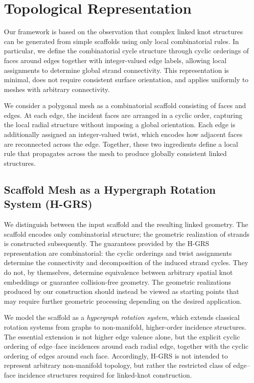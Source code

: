 \documentclass[acmtog]{acmart}
\begin{document}
\section{Topological Representation}
\label{sec:representation}

Our framework is based on the observation that complex linked knot structures can be generated from simple scaffolds using only local combinatorial rules. In particular, we define the combinatorial cycle structure through cyclic orderings of faces around edges together with integer-valued edge labels, allowing local assignments to determine global strand connectivity. This representation is minimal, does not require consistent surface orientation, and applies uniformly to meshes with arbitrary connectivity.

We consider a polygonal mesh as a combinatorial scaffold consisting of faces and edges. At each edge, the incident faces are arranged in a cyclic order, capturing the local radial structure without imposing a global orientation. Each edge is additionally assigned an integer-valued twist, which encodes how adjacent faces are reconnected across the edge. Together, these two ingredients define a local rule that propagates across the mesh to produce globally consistent linked structures.





\subsection{Scaffold Mesh as a Hypergraph Rotation System (H-GRS)}

We distinguish between the input scaffold and the resulting linked geometry. The scaffold encodes only combinatorial structure; the geometric realization of strands is constructed subsequently.
The guarantees provided by the H-GRS representation are combinatorial: the cyclic orderings and twist assignments determine the connectivity and decomposition of the induced strand cycles. They do not, by themselves, determine equivalence between arbitrary spatial knot embeddings or guarantee collision-free geometry. The geometric realizations produced by our construction should instead be viewed as starting points that may require further geometric processing depending on the desired application.

We model the scaffold as a \emph{hypergraph rotation system}, which extends classical rotation systems from graphs to non-manifold, higher-order incidence structures. The essential extension is not higher edge valence alone, but the explicit cyclic ordering of edge--face incidences around each radial edge, together with the cyclic ordering of edges around each face. Accordingly, H-GRS is not intended to represent arbitrary non-manifold topology, but rather the restricted class of edge--face incidence structures required for linked-knot construction.
\end{document}
